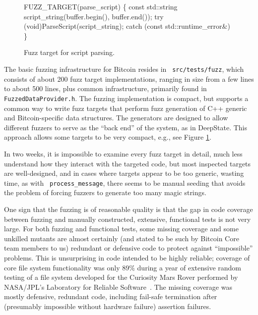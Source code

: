 \begin{figure}
  {\scriptsize
  \begin{code}
    FUZZ\_TARGET(parse\_script)
\{
    const std::string script\_string(buffer.begin(), buffer.end());
    try {
        (void)ParseScript(script\_string);
    } catch (const std::runtime\_error\&) {
    }
\}
\end{code}
}
\caption{Fuzz target for script parsing.}
\label{script}
\end{figure}
  

\begin{sloppypar}
The basic fuzzing infrastructure for Bitcoin resides in {\tt
  src/tests/fuzz}, which consists of about 200 fuzz target
implementations, ranging in size from a few lines to about 500 lines,
plus common infrastructure, primarily found in {\tt
  FuzzedDataProvider.h}.  The fuzzing implementation is compact, but
supports a common way to write fuzz targets that perform fuzz
generation of C++ generic and Bitcoin-specific data structures.  The
generators are designed to allow different fuzzers to serve as the
``back end'' of the system, as in DeepState.  This approach allows
some targets to be very compact, e.g., see Figure \ref{script}.

In two weeks, it is impossible to examine every fuzz target in detail,
much less understand how they interact with the targeted code, but
most inspected targets are well-designed, and in cases where targets
appear to be too generic, wasting time, as with {\tt
  process\_message}, there seems to be manual seeding that avoids the
problem of forcing fuzzers to generate too many magic strings.
\end{sloppypar}

One sign that the fuzzing is of reasonable quality is that the gap in code
coverage between fuzzing and manually constructed, extensive,
functional tests is not very large.  
For both fuzzing and functional tests, some missing coverage and some
unkilled mutants are almost
certainly (and stated to be such by Bitcoin Core team members to us)
redundant or defensive code to protect against ``impossible''
problems.  This is unsurprising in code intended to be highly reliable;
coverage of core file system functionality was only 89\% during a year of
extensive random testing of a file system developed for the Curiosity
Mars Rover performed by NASA/JPL's Laboratory for Reliable
Software~\cite{ICSEDiff}.  The missing coverage was mostly defensive,
redundant code, including fail-safe termination after (presumably
impossible without hardware failure)
assertion failures.

